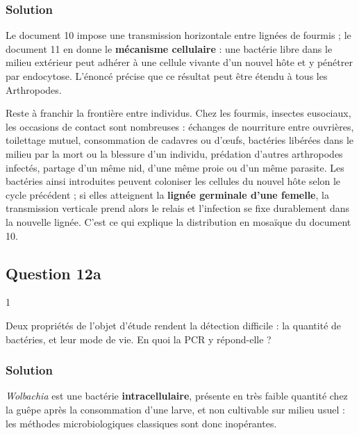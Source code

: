 \documentclass[11pt,a4paper]{article}
\begin{document}
\hypertarget{solution-67}{%
\subsubsection{Solution}\label{solution-67}}

Le document 10 impose une transmission horizontale entre lignées de fourmis ; le document 11 en donne le \textbf{mécanisme cellulaire} : une bactérie libre dans le milieu extérieur peut adhérer à une cellule vivante d'un nouvel hôte et y pénétrer par endocytose. L'énoncé précise que ce résultat peut être étendu à tous les Arthropodes.

Reste à franchir la frontière entre individus. Chez les fourmis, insectes eusociaux, les occasions de contact sont nombreuses : échanges de nourriture entre ouvrières, toilettage mutuel, consommation de cadavres ou d'œufs, bactéries libérées dans le milieu par la mort ou la blessure d'un individu, prédation d'autres arthropodes infectés, partage d'un même nid, d'une même proie ou d'un même parasite. Les bactéries ainsi introduites peuvent coloniser les cellules du nouvel hôte selon le cycle précédent ; si elles atteignent la \textbf{lignée germinale d'une femelle}, la transmission verticale prend alors le relais et l'infection se fixe durablement dans la nouvelle lignée. C'est ce qui explique la distribution en mosaïque du document 10.

\hypertarget{question-12a}{%
\subsection{Question 12a}\label{question-12a}}

\begin{indication}{1}

Deux propriétés de l'objet d'étude rendent la détection difficile : la quantité de bactéries, et leur mode de vie. En quoi la PCR y répond-elle ?

\end{indication}

\hypertarget{solution-68}{%
\subsubsection{Solution}\label{solution-68}}

\emph{Wolbachia} est une bactérie \textbf{intracellulaire}, présente en très faible quantité chez la guêpe après la consommation d'une larve, et non cultivable sur milieu usuel : les méthodes microbiologiques classiques sont donc inopérantes.
\end{document}
